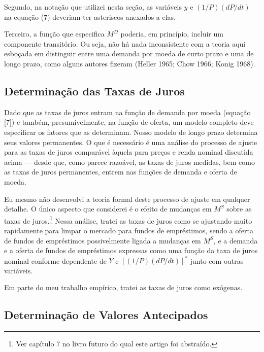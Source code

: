 \documentclass[12pt]{article}
\begin{document}
Segundo, na notação que utilizei nesta seção, as variáveis $y$ e $(1/P)(dP/dt)$ na equação (7) deveriam ter asteriscos anexados a elas.

Terceiro, a função que especifica $M^D$ poderia, em princípio, incluir um componente transitório. Ou seja, não há nada inconsistente com a teoria aqui esboçada em distinguir entre uma demanda por moeda de curto prazo e uma de longo prazo, como alguns autores fizeram (Heller 1965; Chow 1966; Konig 1968).

\subsection{Determinação das Taxas de Juros}

Dado que as taxas de juros entram na função de demanda por moeda (equação [7]) e também, presumivelmente, na função de oferta, um modelo completo deve especificar os fatores que as determinam. Nosso modelo de longo prazo determina seus valores permanentes. O que é necessário é uma análise do processo de ajuste para as taxas de juros comparável àquela para preços e renda nominal discutida acima — desde que, como parece razoável, as taxas de juros medidas, bem como as taxas de juros permanentes, entrem nas funções de demanda e oferta de moeda.

Eu mesmo não desenvolvi a teoria formal deste processo de ajuste em qualquer detalhe. O único aspecto que considerei é o efeito de mudanças em $M^S$ sobre as taxas de juros.\footnote{Ver capítulo 7 no livro futuro do qual este artigo foi abstraído.} Nessa análise, tratei as taxas de juros como se ajustando muito rapidamente para limpar o mercado para fundos de empréstimos, sendo a oferta de fundos de empréstimos possivelmente ligada a mudanças em $M^S$, e a demanda e a oferta de fundos de empréstimos expressas como uma função da taxa de juros nominal conforme dependente de $Y$ e $[(1/P)(dP/dt)]^*$ junto com outras variáveis.

Em parte do meu trabalho empírico, tratei as taxas de juros como exógenas.

\subsection{Determinação de Valores Antecipados}
\end{document}
